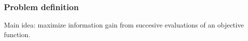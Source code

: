 \documentclass[10pt,handout]{beamer}
\begin{document}
\begin{frame}
\frametitle{Problem definition}

Main idea: maximize information gain from succesive evaluations of an objective 
function.

% 
% 





\end{frame}

 
\end{document}
